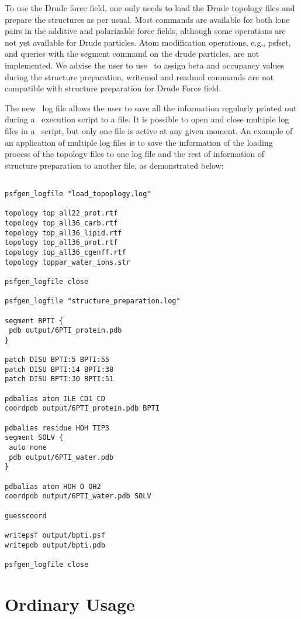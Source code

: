 To use the Drude force field, one only needs to load the Drude topology files 
and prepare the structures as per usual. Most commands are 
available for both lone pairs in the additive and polarizable force fields, 
although some operations are not yet available for Drude particles. 
Atom modification operations, e.g., psfset, and queries with the segment command 
on the drude particles, are not implemented. We advise the user to use \VMD\ 
to assign beta and occupancy values during the structure preparation. writemol 
and readmol commands are not compatible with structure preparation for 
Drude Force field.

The new \PSFGEN\ log file allows the user to save all the information regularly
printed out during a \PSFGEN\ execution script to a file. It is possible to
open and close multiple log files in a \PSFGEN\ script, but only one file is 
active at any given moment. An example of an application of multiple log files
is to save the information of the loading process of the topology files to 
one log file and the rest of information of structure preparation to another 
file, as demonstrated below:

\begin{verbatim}

psfgen_logfile "load_topoplogy.log" 

topology top_all22_prot.rtf	
topology top_all36_carb.rtf	
topology top_all36_lipid.rtf	
topology top_all36_prot.rtf	
topology top_all36_cgenff.rtf	
topology toppar_water_ions.str

psfgen_logfile close

psfgen_logfile "structure_preparation.log" 

segment BPTI {
 pdb output/6PTI_protein.pdb
}

patch DISU BPTI:5 BPTI:55
patch DISU BPTI:14 BPTI:38
patch DISU BPTI:30 BPTI:51

pdbalias atom ILE CD1 CD
coordpdb output/6PTI_protein.pdb BPTI

pdbalias residue HOH TIP3  
segment SOLV {
 auto none
 pdb output/6PTI_water.pdb
}

pdbalias atom HOH O OH2
coordpdb output/6PTI_water.pdb SOLV

guesscoord

writepsf output/bpti.psf
writepdb output/bpti.pdb

psfgen_logfile close

\end{verbatim}
\section{Ordinary Usage}


